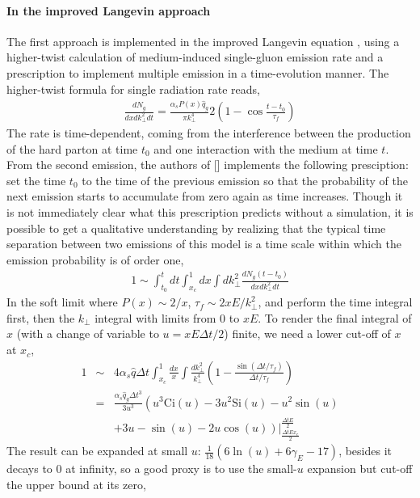 \documentclass[aps, prc, reprint, amsmath, groupedaddress, nofootinbib]{revtex4-1}
\begin{document}
\begin{appendices}
\paragraph{In the improved Langevin approach}
The first approach is implemented in the improved Langevin equation \cite{Cao:2013ita}, using a higher-twist calculation of  medium-induced single-gluon emission rate and a prescription to implement multiple emission in a time-evolution manner.
The higher-twist formula for single radiation rate reads,
\begin{eqnarray}
\frac{dN_g}{dx dk_\perp^2 dt} = \frac{\alpha_s P(x)\hat{q}_g}{\pi k_\perp^4} 2\left(1-\cos\frac{t-t_0}{\tau_f}\right)
\end{eqnarray}
The rate is time-dependent, coming from the interference between the production of the hard parton at time $t_0$ and one interaction with the medium at time $t$.
From the second emission, the authors of [] implements the following presciption: set the time $t_0$ to the time of the previous emission so that the probability of the next emission starts to accumulate from zero again as time increases.
Though it is not immediately clear what this prescription predicts without a simulation, it is possible to get a qualitative understanding by realizing that the typical time separation between two emissions of this model is a time scale within which the emission probability is of order one,
\begin{eqnarray}
1 \sim \int_{t_0}^{t} dt\int_{x_c}^1 dx \int dk_\perp^2 \frac{dN_g(t-t_0)}{dx dk_\perp^2 dt}
\end{eqnarray}
In the soft limit where $P(x) \sim 2/x$, $\tau_f\sim 2xE/k_\perp^2$, and perform the time integral first, then the $k_\perp$ integral with limits from $0$ to $xE$.
To render the final integral of $x$ (with a change of variable to $u = xE\Delta t/2$) finite, we need a lower cut-off of $x$ at $x_c$,
\begin{eqnarray}
1 &\sim& 4\alpha_s\hat{q}\Delta t \int_{x_c}^1 \frac{dx}{x} \int \frac{dk_\perp^2}{k_\perp^4}\left(1-\frac{\sin(\Delta t/\tau_f)}{\Delta t/\tau_f}\right)\\
&=& \frac{\alpha_s\hat{q}_g \Delta t^3}{3u^3} \left( u^3\mathrm{Ci}(u)-3u^2\mathrm{Si}(u) - u^2 \sin(u) \right. \\\nonumber
&&\left. +3u-\sin(u) - 2u\cos(u) \right) \left.\right|_{\frac{\Delta t E x_c}{2}}^{\frac{\Delta t E}{2}} 
\end{eqnarray}
The result can be expanded at small $u$: $\frac{1}{18}(6\ln(u)+6\gamma_E - 17)$, besides it decays to $0$ at infinity, so a good proxy is to use the small-$u$ expansion but cut-off the upper bound at its zero,

\end{appendices}
\end{document}
